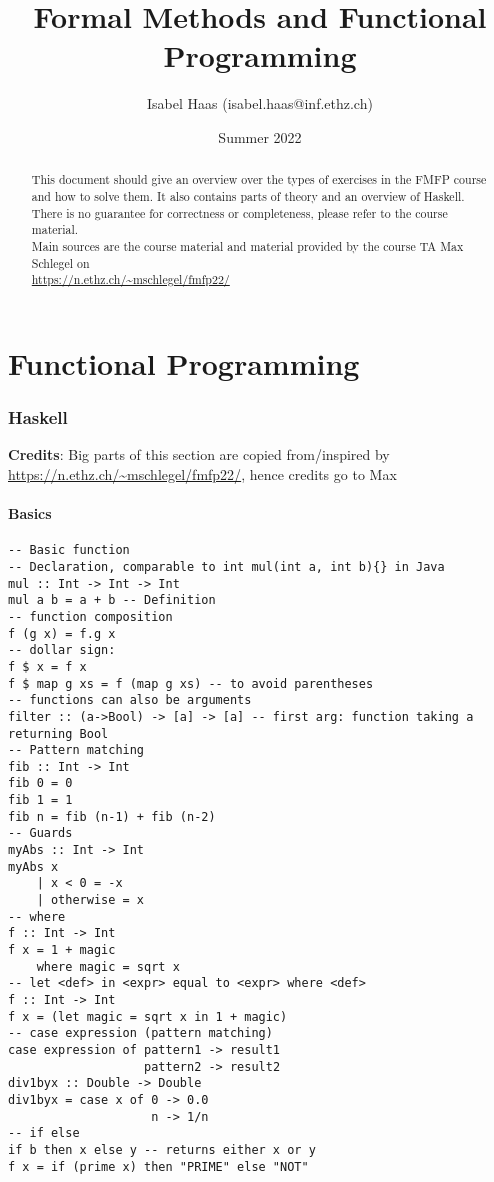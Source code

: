 \documentclass{article}
\title{Formal Methods and Functional Programming}
\author{Isabel Haas (isabel.haas@inf.ethz.ch)}
\date{Summer 2022}
\begin{document}
\maketitle

\begin{abstract}
    This document should give an overview over the types of exercises in the FMFP course and how to solve them.
    It also contains parts of theory and an overview of Haskell. \\
    There is no guarantee for correctness or completeness, please refer to the course material. \\
    Main sources are the course material and material provided by the course TA
    Max Schlegel on \\ \url{https://n.ethz.ch/~mschlegel/fmfp22/}
\end{abstract}

\thispagestyle{empty}
\tableofcontents

\newpage

\part*{Functional Programming}
\setcounter{section}{0}
\renewcommand*{\theHsection}{chX.\the\value{section}}

\section{Haskell}
\textbf{Credits}: Big parts of this section are copied from/inspired by \url{https://n.ethz.ch/~mschlegel/fmfp22/}, hence credits go to Max
\setcounter{page}{1}
\subsection{Basics}
\begin{verbatim}
-- Basic function
-- Declaration, comparable to int mul(int a, int b){} in Java
mul :: Int -> Int -> Int 
mul a b = a + b -- Definition
-- function composition
f (g x) = f.g x
-- dollar sign:
f $ x = f x
f $ map g xs = f (map g xs) -- to avoid parentheses 
-- functions can also be arguments
filter :: (a->Bool) -> [a] -> [a] -- first arg: function taking a returning Bool
-- Pattern matching
fib :: Int -> Int
fib 0 = 0
fib 1 = 1
fib n = fib (n-1) + fib (n-2)
-- Guards
myAbs :: Int -> Int 
myAbs x
    | x < 0 = -x
    | otherwise = x
-- where 
f :: Int -> Int
f x = 1 + magic 
    where magic = sqrt x
-- let <def> in <expr> equal to <expr> where <def>
f :: Int -> Int
f x = (let magic = sqrt x in 1 + magic)
-- case expression (pattern matching)
case expression of pattern1 -> result1
                   pattern2 -> result2
div1byx :: Double -> Double
div1byx = case x of 0 -> 0.0
                    n -> 1/n
-- if else
if b then x else y -- returns either x or y
f x = if (prime x) then "PRIME" else "NOT" 
\end{verbatim}
\end{document}
